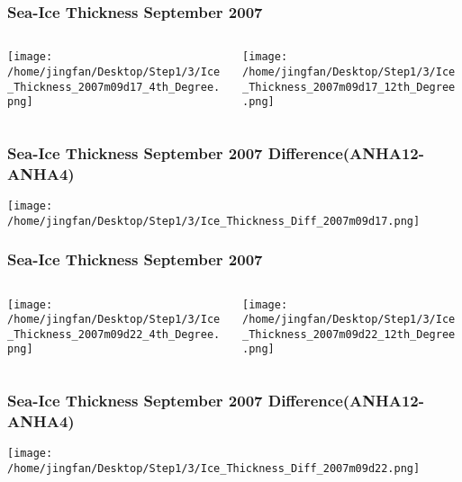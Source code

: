\documentclass{beamer}
\begin{document}
\begin{frame}
\frametitle{Sea-Ice Thickness September 2007}

\begin{columns}
\begin{column}[t]{0.5\linewidth}
\centering
\texttt{[image: /home/jingfan/Desktop/Step1/3/Ice\_Thickness\_2007m09d17\_4th\_Degree.png]}
\end{column}
\begin{column}[t]{0.5\linewidth}
\centering
\texttt{[image: /home/jingfan/Desktop/Step1/3/Ice\_Thickness\_2007m09d17\_12th\_Degree.png]}
\end{column}
\end{columns}

\end{frame}

\begin{frame}
\frametitle{Sea-Ice Thickness September 2007 Difference(ANHA12-ANHA4)}

\texttt{[image: /home/jingfan/Desktop/Step1/3/Ice\_Thickness\_Diff\_2007m09d17.png]}

\end{frame}

\begin{frame}
\frametitle{Sea-Ice Thickness September 2007}

\begin{columns}
\begin{column}[t]{0.5\linewidth}
\centering
\texttt{[image: /home/jingfan/Desktop/Step1/3/Ice\_Thickness\_2007m09d22\_4th\_Degree.png]}
\end{column}
\begin{column}[t]{0.5\linewidth}
\centering
\texttt{[image: /home/jingfan/Desktop/Step1/3/Ice\_Thickness\_2007m09d22\_12th\_Degree.png]}
\end{column}
\end{columns}

\end{frame}

\begin{frame}
\frametitle{Sea-Ice Thickness September 2007 Difference(ANHA12-ANHA4)}

\texttt{[image: /home/jingfan/Desktop/Step1/3/Ice\_Thickness\_Diff\_2007m09d22.png]}

\end{frame}
\end{document}
